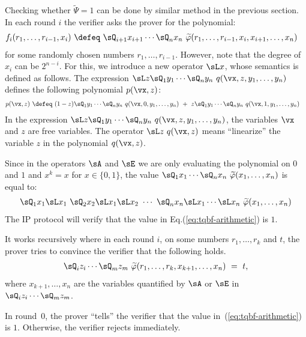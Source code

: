 \documentclass[11pt, a4paper]{article}
\begin{document}
Checking whether $\widetilde{\Psi}=1$ can be done by similar method in the previous section.
In each round $i$ the verifier asks the prover for the polynomial:
\begin{align*}
f_i(r_1,\ldots,r_{i-1},x_i) &\ \defeq \
\sQ_{i+1} x_{i+1} \cdots \sQ_n x_n \ \widetilde{\varphi}(r_1,\ldots,r_{i-1},x_i,x_{i+1},\ldots,x_n)
\end{align*}
for some randomly chosen numbers $r_1,\ldots,r_{i-1}$.
However, note that the degree of $x_i$ can be $2^{n-i}$.
For this, we introduce a new operator $\sL x$, whose semantics is defined as follows.
The expression $\sL z \sQ_1 y_1 \cdots  \sQ_n y_n\ q(\vx,z,y_1,\ldots,y_n)$
defines the following polynomial $p(\vx,z)$:
\begin{align*}
p(\vx,z) & \ \defeq \
(1 - z) \sQ_1y_1 \cdots \sQ_n y_n \ q(\vx,0,y_1,\ldots,y_n) \ + \
z \sQ_1y_1 \cdots \sQ_n y_n \ q(\vx,1,y_1,\ldots,y_n)
\end{align*}
In the expression $\sL z \sQ_1 y_1 \cdots  \sQ_n y_n\ q(\vx,z,y_1,\ldots,y_n)$,
the variables $\vx$ and $z$ are free variables.
The operator $\sL z\ q(\vx,z)$ means ``linearize'' the variable $z$ in the polynomial $q(\vx,z)$.

Since in the operators $\sA$ and $\sE$ we are only evaluating the polynomial on $0$ and $1$
and $x^k = x$ for $x\in \{0,1\}$, 
the value $\sQ_{1} x_{1} \cdots \sQ_n x_n \ \widetilde{\varphi}(x_1,\ldots,x_n)$ is equal to:
\begin{align}
\label{eq:tqbf-arithmetic}
\sQ_{1} x_{1} \sL x_1\ \sQ_2 x_2 \sL x_1 \sL x_2\ \cdots\
 \sQ_n x_n \sL x_1 \cdots \sL x_{n} \ \widetilde{\varphi}(x_1,\ldots,x_n) 
\end{align}
The IP protocol will verify that the value in Eq.(\ref{eq:tqbf-arithmetic}) is $1$.

It works recursively where in each round $i$, on some numbers $r_1,\ldots,r_k$ and $t$,
the prover tries to convince the verifier that the following holds.
\begin{align}
\label{eq:tqbf-induction}
\sQ_{i} z_i \cdots \sQ_m z_m \ \widetilde{\varphi}(r_1,\ldots,r_k,x_{k+1},\ldots,x_n)
\ = \ t,
\end{align}
where $x_{k+1},\ldots,x_n$ are
the variables quantified by $\sA$ or $\sE$ in $\sQ_iz_i \cdots \sQ_mz_m$.

In round~0, the prover ``tells'' the verifier that the value in~(\ref{eq:tqbf-arithmetic}) is $1$.
Otherwise, the verifier rejects immediately.
\end{document}
